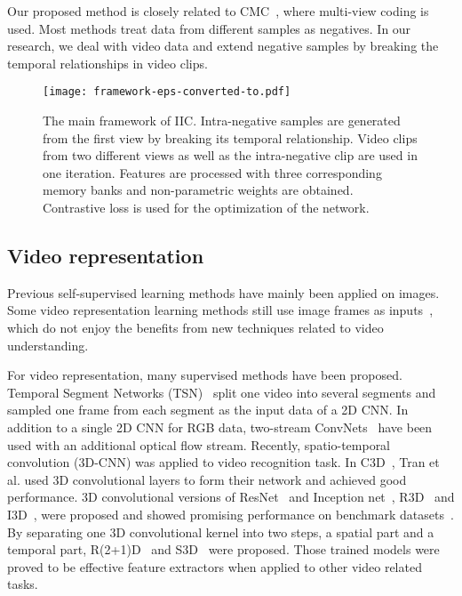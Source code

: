 \documentclass[sigconf]{acmart}
\begin{document}
Our proposed method is closely related to CMC~\cite{tian2019contrastive}, where multi-view coding is used. Most methods treat data from different samples as negatives. In our research, we deal with video data and extend negative samples by breaking the temporal relationships in video clips.

\begin{figure*}[t]
  \centering
  \texttt{[image: framework-eps-converted-to.pdf]}
  \caption{The main framework of IIC. Intra-negative samples are generated from the first view by breaking its temporal relationship. Video clips from two different views as well as the intra-negative clip are used in one iteration. Features are processed with three corresponding memory banks and non-parametric weights are obtained. Contrastive loss is used for the optimization of the network.}
  \label{framework}
\end{figure*} 

\subsection{Video representation}
Previous self-supervised learning methods have mainly been applied on images. Some video representation learning methods still use image frames as inputs~\cite{misra2016shuffle,fernando2017self,lee2017unsupervised}, which do not enjoy the benefits from new techniques related to video understanding.

For video representation, many supervised methods have been proposed. Temporal Segment Networks (TSN)~\cite{wang2016temporal} split one video into several segments and sampled one frame from each segment as the input data of a 2D CNN. In addition to a single 2D CNN for RGB data, two-stream ConvNets~\cite{simonyan2014two, feichtenhofer2016convolutional, feichtenhofer2016spatiotemporal} have been used with an additional optical flow stream. Recently, spatio-temporal convolution (3D-CNN) was applied to video recognition task. In C3D~\cite{c3d}, Tran et al. used 3D convolutional layers to form their network and achieved good performance. 3D convolutional versions of ResNet~\cite{resnet} and Inception net~\cite{inception}, R3D~\cite{res3d} and I3D~\cite{i3d}, were proposed and showed promising performance on benchmark datasets~\cite{ucf101,hmdb,kinetics}. By separating one 3D convolutional kernel into two steps, a spatial part and a temporal part, R(2+1)D~\cite{r3d} and S3D~\cite{s3d} were proposed. Those trained models were proved to be effective feature extractors when applied to other video related tasks.
\end{document}

